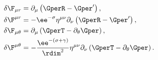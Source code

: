 \begin{equation}
\begin{aligned}
\delta \F_{\mu r} & = \partial_\mu \left(\GperR - \Gper' \right),\\
\delta \F^{\mu r} & = - \ee^{-\sigma} \eta^{\mu \nu} \partial_\nu
\left(\GperR - \Gper' \right),\\ \delta \F_{\mu \theta} & =
\partial_\mu \left(\GperT - \partial_\theta \Gper \right),\\ \delta
\F^{\mu \theta} & = - \frac{\ee^{-(\sigma+\gamma)}}{\rdim^2} \eta^{\mu
\nu} \partial_\nu \left(\GperT - \partial_\theta \Gper \right).
\end{aligned}
\end{equation}

